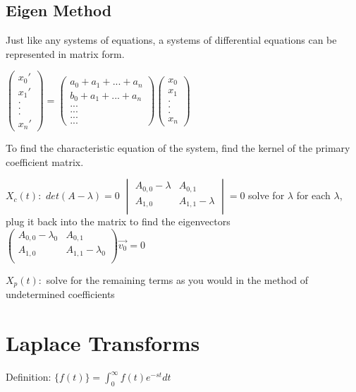 \documentclass[12 pt, oneside]{book}
\begin{document}
\section{Eigen Method}

Just like any systems of equations, a systems of differential equations can be represented in matrix form.

$\begin{pmatrix}
  x_0'\\
  x_1'\\
  .\\
  .\\
  .\\
  x_n'
\end{pmatrix}
=
\begin{pmatrix}
  a_0+a_1+...+a_n\\
  b_0+a_1+...+a_n\\
  ...\\
  ...\\
  ...\\
  ...
\end{pmatrix}
\begin{pmatrix}
  x_0\\
  x_1\\
  .\\
  .\\
  .\\
  x_n
\end{pmatrix}$
\newline{}

To find the characteristic equation of the system, find the kernel of the primary coefficient matrix.

$X_c(t):$
$det(A-\lambda)=0$
$\begin{vmatrix}
  A_{0,0}-\lambda & A_{0,1} \\
  A_{1,0} & A_{1,1}-\lambda \\
\end{vmatrix}=0$
solve for $\lambda$
for each $\lambda$, plug it back into the matrix to find the eigenvectors
$\begin{pmatrix}
  A_{0,0}-\lambda_0 & A_{0,1} \\
  A_{1,0} & A_{1,1}-\lambda_0 \\
  \end{pmatrix}\vec{v_0}=0$

$X_p(t):$
solve for the remaining terms as you would in the method of undetermined coefficients

\chapter{Laplace Transforms}
Definition:\newline{}
\laplace $\{f(t)\} =\int_0^\infty f(t)e^{-st}dt$
\end{document}
